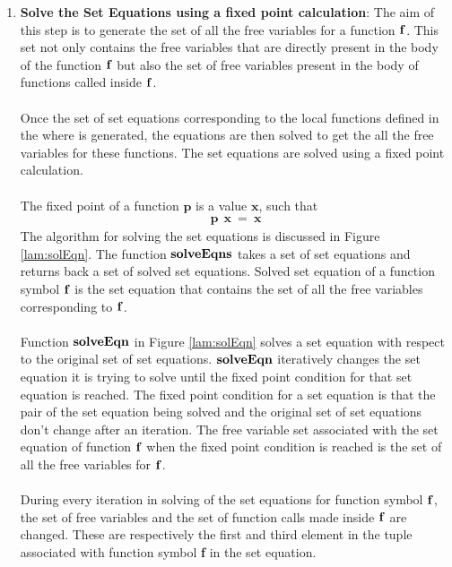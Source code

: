 \documentclass[11pt]{article}
\begin{document}
\begin{enumerate}
    \item {\bf Solve the Set Equations using a fixed point calculation}: The aim of this step is to generate the set of all the free variables for a function ${\bf f}$. This set not only contains the free variables that are directly present in the body of the function ${\bf f}$ but also the set of free variables present in the body of functions called inside ${\bf f}$.
    ~~\\~~\\
    Once the set of set equations corresponding to the local functions defined in the {\sf where} is generated, the equations are then solved to get the all the free variables for these functions. The set equations are solved using a fixed point calculation.
    ~~\\~~\\ 
    The fixed point of a function $\mathbf{p}$ is a value $\mathbf{x}$, such that
    \begin{align*}
    \mathbf{p~~x~=~x}
    \end{align*}
    The algorithm for solving the set equations is discussed in Figure \ref {lam:solEqn}. The function ${\bf solveEqns}$ takes a set of set equations and returns back a set of solved set equations. Solved set equation of a function symbol ${\bf f}$ is the set equation that contains the set of all the free variables corresponding to ${\bf f}$.
    ~~\\~~\\ 
    Function ${\bf solveEqn}$ in Figure  \ref {lam:solEqn} solves a set equation with respect to the original set of set equations. ${\bf solveEqn}$ iteratively changes the set equation it is trying to solve until the fixed point condition for that set equation is reached. The fixed point condition for a set equation is that the pair of the set equation being solved and the original set of set equations don't change after an iteration. The free variable set associated with the set equation of function ${\bf f}$ when the fixed point condition is reached is the set of all the free variables for ${\bf f}$.
    ~~\\~~\\
    During every iteration in solving of the set equations for function symbol ${\bf f}$, the set of free variables and the set of function calls made inside ${\bf f}$ are changed. These are respectively the first and third element in the tuple associated with function symbol {\bf f} in the set equation.
    ~~\\~~\\

\end{enumerate}
\end{document}
